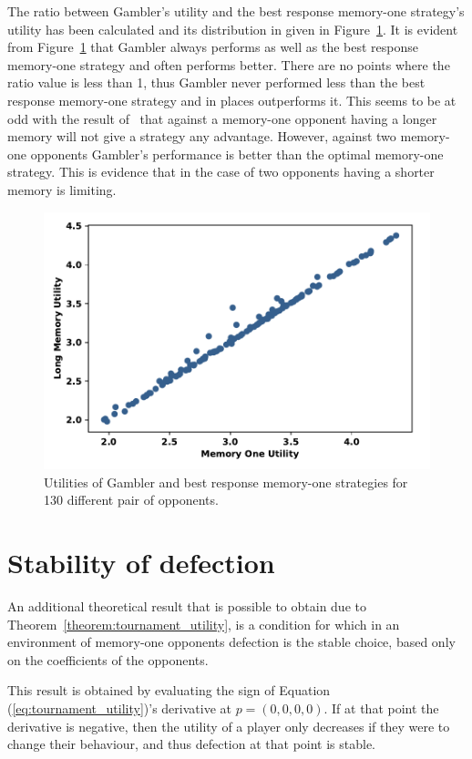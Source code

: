 The ratio between Gambler's utility and the best response memory-one strategy's utility has been calculated and its distribution in
given in Figure~\ref{fig:utilities_gambler_mem_one}.
It is evident from Figure~\ref{fig:utilities_gambler_mem_one} that
Gambler always performs as well as the best response memory-one strategy and often performs better. There are
no points where the ratio value is less than 1, thus Gambler never performed less
than the best response memory-one strategy and in places outperforms it. This seems to be at odd with the
result of~\cite{Press2012} that against a memory-one opponent having a longer memory
will not give a strategy any
advantage. However, against two memory-one opponents Gambler's performance is better than
the optimal memory-one strategy. This is evidence that in the case of two opponents having a
shorter memory is limiting.

\begin{figure}[!htbp]
    \centering
    \includegraphics[width=.55\textwidth]{src/chapters/05/paper/memory-size-in-the-prisoners-dilemma/img/gambler_performance_against_mem_one.pdf}
    \caption{Utilities of Gambler and best response memory-one strategies for
    130 different pair of opponents.}\label{fig:utilities_gambler_mem_one}
\end{figure}

\section{Stability of defection}\label{section:stability_of_defection}

An additional theoretical result that is possible to obtain due to
Theorem~\ref{theorem:tournament_utility}, is a condition for which in an
environment of memory-one opponents defection is the stable choice, based only
on the coefficients of the opponents.

This result is obtained by evaluating the sign of Equation
(\ref{eq:tournament_utility})'s derivative at \(p=(0, 0, 0, 0)\). If at that
point the derivative is negative, then the utility of a player only decreases if
they were to change their behaviour, and thus defection at that point is stable.

